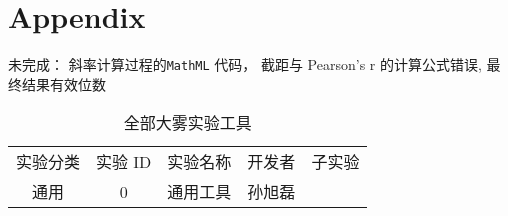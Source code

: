 \appendix
\onecolumn
\section{Appendix}
未完成：
斜率计算过程的 \verb|MathML| 代码，
截距与 Pearson's r 的计算公式错误,
最终结果有效位数

\begin{table*}[t]
  \caption{全部大雾实验工具}
  \label{tab:func}
  \vskip 0.1in
  \centering\small
  \begin{tabular}{|c|c|c|c|c|}
    \hline
    实验分类 & 实验 ID & 实验名称 & 开发者 & 子实验 \\
    \hhline{|=|=|=|=|=|}
    通用 & 0 & 通用工具 & 孙旭磊 &\\
    \hline
  \end{tabular}
  \vskip -0.1in
\end{table*}